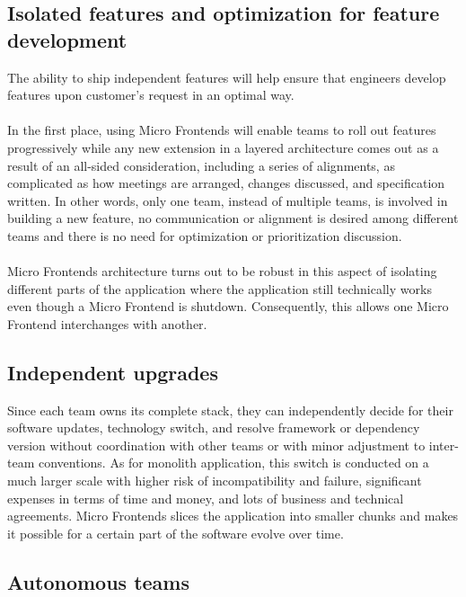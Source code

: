 \documentclass[a4paper]{book}
\begin{document}
\subsection{Isolated features and optimization for feature development}

The ability to ship independent features will help ensure that engineers develop features upon customer’s request in an optimal way. 
\\ \\
In the first place, using Micro Frontends will enable teams to roll out features progressively while any new extension in a layered architecture comes out as a result of an all-sided consideration, including a series of alignments, as complicated as how meetings are arranged, changes discussed, and specification written. In other words, only one team, instead of multiple teams, is involved in building a new feature, no communication or alignment is desired among different teams and there is no need for optimization or prioritization discussion.
\\ \\
Micro Frontends architecture turns out to be robust in this aspect of isolating different parts of the application where the application still technically works even though a Micro Frontend is shutdown. Consequently, this allows one Micro Frontend interchanges with another.

\subsection{Independent upgrades}

Since each team owns its complete stack, they can independently decide for their software updates, technology switch, and resolve framework or dependency version without coordination with other teams or with minor adjustment to inter-team conventions. As for monolith application, this switch is conducted on a much larger scale with higher risk of incompatibility and failure, significant expenses in terms of time and money, and lots of business and technical agreements. Micro Frontends slices the application into smaller chunks and makes it possible for a certain part of the software evolve over time.

\subsection{Autonomous teams}
\end{document}
